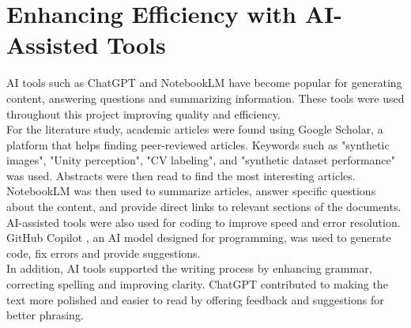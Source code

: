 \section{Enhancing Efficiency with AI-Assisted Tools}

AI tools such as ChatGPT \cite{OpenAIChatGPT2024} and NotebookLM \cite{GoogleNotebookLM2024} have become popular for generating content, answering questions and summarizing information. These tools were used throughout this project improving quality and efficiency. \\

\noindent For the literature study, academic articles were found using Google Scholar, a platform that helps finding peer-reviewed articles. Keywords such as "synthetic images", "Unity perception", "CV labeling", and "synthetic dataset performance" was used. Abstracts were then read to find the most interesting articles. NotebookLM was then used to summarize articles, answer specific questions about the content, and provide direct links to relevant sections of the documents.\\

\noindent AI-assisted tools were also used for coding to improve speed and error resolution. GitHub Copilot \cite{GitHubCopilot2024}, an AI model designed for programming, was used to generate code, fix errors and provide suggestions.\\

\noindent In addition, AI tools supported the writing process by enhancing grammar, correcting spelling and improving clarity. ChatGPT contributed to making the text more polished and easier to read by offering feedback and suggestions for better phrasing.


